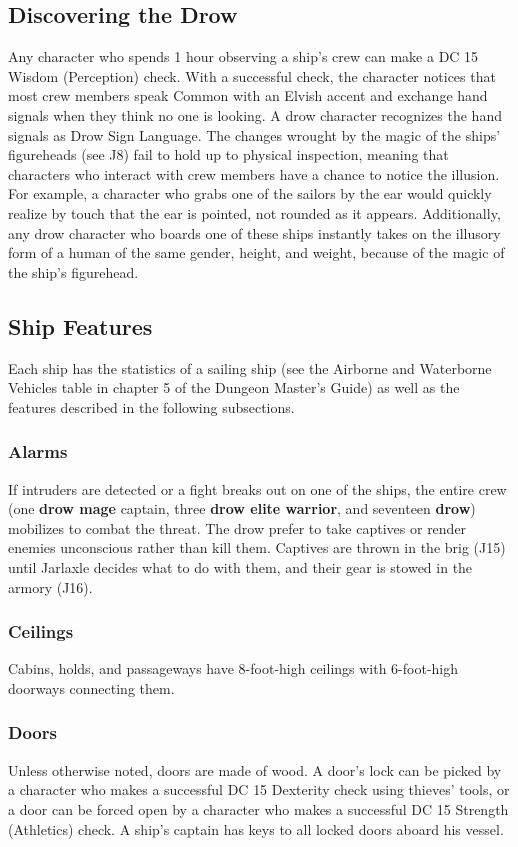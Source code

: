 \documentclass[10pt,a4paper,twoside,twocolumn,openany,nodeprecatedcode]{dndbook}
\begin{document}
\subsection{Discovering the Drow}
Any character who spends 1 hour observing a ship's crew can make a DC 15 Wisdom (Perception) check. With a successful check, the character notices that most crew members speak Common with an Elvish accent and exchange hand signals when they think no one is looking. A drow character recognizes the hand signals as Drow Sign Language.
The changes wrought by the magic of the ships' figureheads (see J8) fail to hold up to physical inspection, meaning that characters who interact with crew members have a chance to notice the illusion. For example, a character who grabs one of the sailors by the ear would quickly realize by touch that the ear is pointed, not rounded as it appears. Additionally, any drow character who boards one of these ships instantly takes on the illusory form of a human of the same gender, height, and weight, because of the magic of the ship's figurehead.
\subsection{Ship Features}
Each ship has the statistics of a sailing ship (see the Airborne and Waterborne Vehicles table in chapter 5 of the Dungeon Master's Guide) as well as the features described in the following subsections.
\subsubsection{Alarms}
If intruders are detected or a fight breaks out on one of the ships, the entire crew (one \textbf{drow mage} captain, three \textbf{drow elite warrior}, and seventeen \textbf{drow}) mobilizes to combat the threat. The drow prefer to take captives or render enemies unconscious rather than kill them. Captives are thrown in the brig (J15) until Jarlaxle decides what to do with them, and their gear is stowed in the armory (J16).
\subsubsection{Ceilings}
Cabins, holds, and passageways have 8-foot-high ceilings with 6-foot-high doorways connecting them.
\subsubsection{Doors}
Unless otherwise noted, doors are made of wood. A door's lock can be picked by a character who makes a successful DC 15 Dexterity check using thieves' tools, or a door can be forced open by a character who makes a successful DC 15 Strength (Athletics) check. A ship's captain has keys to all locked doors aboard his vessel.
\end{document}
